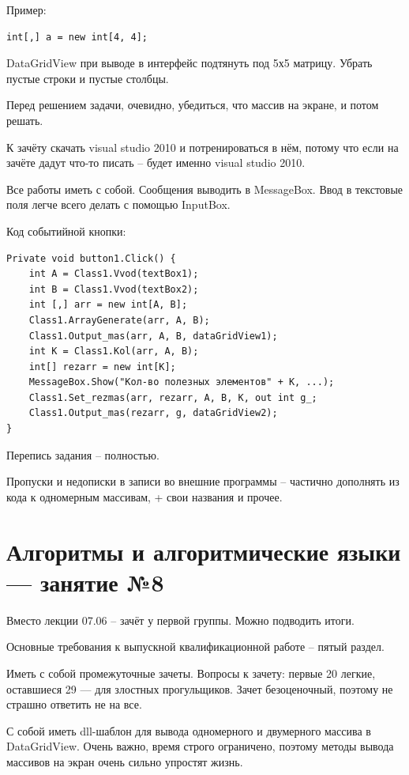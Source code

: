 \documentclass{article}
\begin{document}
Пример:

\begin{verbatim}
int[,] a = new int[4, 4];
\end{verbatim}

\hfill

DataGridView при выводе в интерфейс подтянуть под 5х5 матрицу. Убрать пустые строки и пустые столбцы.

Перед решением задачи, очевидно, убедиться, что массив на экране, и потом решать.

К зачёту скачать visual studio 2010 и потренироваться в нём, потому что если на зачёте дадут что-то писать – будет именно visual studio 2010.

Все работы иметь с собой. Сообщения выводить в MessageBox. Ввод в текстовые поля легче всего делать с помощью InputBox.

\pagebreak

Код событийной кнопки:

\begin{verbatim}
Private void button1.Click() {
    int A = Class1.Vvod(textBox1);
    int B = Class1.Vvod(textBox2);
    int [,] arr = new int[A, B];
    Class1.ArrayGenerate(arr, A, B);
    Class1.Output_mas(arr, A, B, dataGridView1);
    int K = Class1.Kol(arr, A, B);
    int[] rezarr = new int[K];  
    MessageBox.Show("Кол-во полезных элементов" + K, ...);
    Class1.Set_rezmas(arr, rezarr, A, B, K, out int g_;
    Class1.Output_mas(rezarr, g, dataGridView2);
}
\end{verbatim}

Перепись задания – полностью.

Пропуски и недописки в записи во внешние программы – частично дополнять из кода к одномерным массивам, + свои названия и прочее. 

\pagebreak
\section{Алгоритмы и алгоритмические языки — занятие №8}

Вместо лекции 07.06 – зачёт у первой группы. Можно подводить итоги.

Основные требования к выпускной квалификационной работе – пятый раздел.

Иметь с собой промежуточные зачеты. Вопросы к зачету: первые 20 легкие, оставшиеся 29 — для злостных прогульщиков. Зачет безоценочный, поэтому не страшно ответить не на все.

С собой иметь dll-шаблон для вывода одномерного и двумерного массива в DataGridView. Очень важно, время строго ограничено, поэтому методы вывода массивов на экран очень сильно упростят жизнь.
\end{document}
